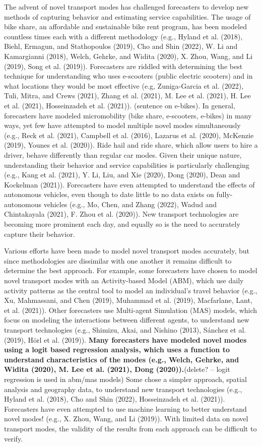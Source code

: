 \documentclass[12pt, oneside, openright]{byuthesis}
\begin{document}
The advent of novel transport modes has challenged forecasters to develop new methods of capturing behavior and estimating service capabilities. The usage of bike share, an affordable and sustainable bike rent program, has been modeled countless times each with a different methodology (e.g., Hyland et al. (2018), Biehl, Ermagun, and Stathopoulos (2019), Cho and Shin (2022), W. Li and Kamargianni (2018), Welch, Gehrke, and Widita (2020), X. Zhou, Wang, and Li (2019), Song et al. (2019)). Forecasters are riddled with determining the best technique for understanding who uses e-scooters (public electric scooters) and in what locations they would be most effective (e.g, Zuniga-Garcia et al. (2022), Tuli, Mitra, and Crews (2021), Zhang et al. (2021), M. Lee et al. (2021), H. Lee et al. (2021), Hosseinzadeh et al. (2021)). (sentence on e-bikes). In general, forecasters have modeled micromobility (bike share, e-scooters, e-bikes) in many ways, yet few have attempted to model multiple novel modes simultaneously (e.g., Reck et al. (2021), Campbell et al. (2016), Lazarus et al. (2020), McKenzie (2019), Younes et al. (2020)). Ride hail and ride share, which allow users to hire a driver, behave differently than regular car modes. Given their unique nature, understanding their behavior and service capabilities is particularly challenging (e.g., Kang et al. (2021), Y. Li, Liu, and Xie (2020), Dong (2020), Dean and Kockelman (2021)). Forecasters have even attempted to understand the effects of autonomous vehicles, even though to date little to no data exists on fully-autonomous vehicles (e.g., Mo, Chen, and Zhang (2022), Wadud and Chintakayala (2021), F. Zhou et al. (2020)). New transport technologies are becoming more prominent each day, and equally so is the need to accurately capture their behavior.

Various efforts have been made to model novel transport modes accurately, but since methodologies are dissimilar with one another it remains difficult to determine the best approach. For example, some forecasters have chosen to model novel transport modes with an Activity-based Model (ABM), which use daily activity patterns as the central tool to model an individual's travel behavior (e.g., Xu, Mahmassani, and Chen (2019), Muhammad et al. (2019), Macfarlane, Lant, et al. (2021)). Other forecasters use Multi-agent Simulation (MAS) models, which focus on modeling the interactions between different agents, to understand new transport technologies (e.g., Shimizu, Akai, and Nishino (2013), Sánchez et al. (2019), Hörl et al. (2019)). \textbf{Many forecasters have modeled novel modes using a logit based regression analysis, which uses a function to understand characteristics of the modes (e.g., Welch, Gehrke, and Widita (2020), M. Lee et al. (2021), Dong (2020)).}(delete? -- logit regression is used in abm/mas models) Some chose a simpler approach, spatial analysis and geography data, to understand new transport technologies (e.g., Hyland et al. (2018), Cho and Shin (2022), Hosseinzadeh et al. (2021)). Forecasters have even attempted to use machine learning to better understand novel modes! (e.g., X. Zhou, Wang, and Li (2019)). With limited data on novel transport modes, the validity of the results from each approach can be difficult to verify.
\end{document}
